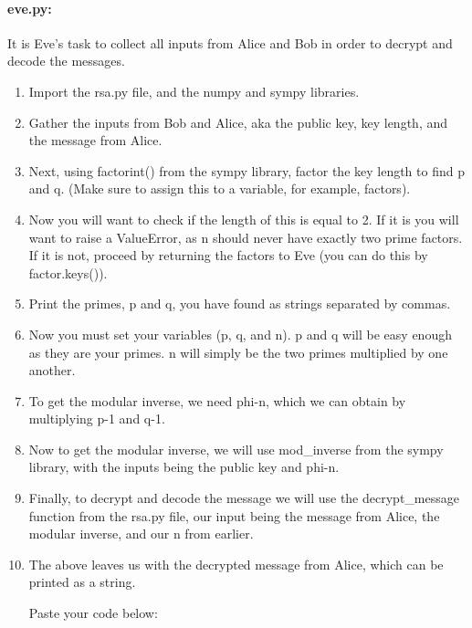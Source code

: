 \documentclass{article}
\begin{document}
    \paragraph{eve.py:} It is Eve’s task to collect all inputs from Alice and Bob in order to decrypt and decode the messages.

    \begin{enumerate}
        \item Import the rsa.py file, and the numpy and sympy libraries.

        \item Gather the inputs from Bob and Alice, aka the public key, key length, and the message from Alice.

        \item Next, using factorint() from the sympy library, factor the key length to find p and q. (Make sure to assign this to a variable, for example, factors).

        \item Now you will want to check if the length of this is equal to 2. If it is you will want to raise a ValueError, as n should never have exactly two prime factors. If it is not, proceed by returning the factors to Eve (you can do this by factor.keys()).

        \item Print the primes, p and q, you have found as strings separated by commas.

        \item Now you must set your variables (p, q, and n). p and q will be easy enough as they are your primes. n will simply be the two primes multiplied by one another.

        \item To get the modular inverse, we need phi-n, which we can obtain by multiplying p-1 and q-1.

        \item Now to get the modular inverse, we will use mod_inverse from the sympy library, with the inputs being the public key and phi-n.

        \item Finally, to decrypt and decode the message we will use the decrypt_message function from the rsa.py file, our input being the message from Alice, the modular inverse, and our n from earlier.

        \item The above leaves us with the decrypted message from Alice, which can be printed as a string.

        Paste your code below:

            \TextField[width=6in,height=5in, bordercolor=0 0 0, name=bob2, multiline=true]{}
    \end{enumerate}
\end{document}
